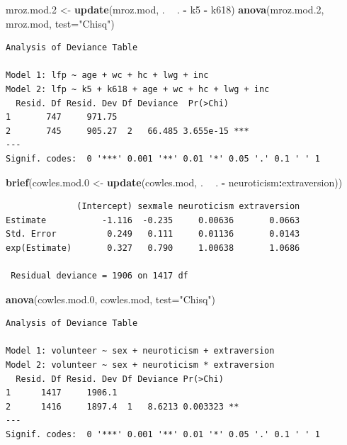 \documentclass[
]{article}
\newenvironment{Shaded}{\begin{snugshade}}{\end{snugshade}}
\newcommand{\DataTypeTok}[1]{\textcolor[rgb]{0.13,0.29,0.53}{#1}}
\newcommand{\FloatTok}[1]{\textcolor[rgb]{0.00,0.00,0.81}{#1}}
\newcommand{\KeywordTok}[1]{\textcolor[rgb]{0.13,0.29,0.53}{\textbf{#1}}}
\newcommand{\NormalTok}[1]{#1}
\newcommand{\OperatorTok}[1]{\textcolor[rgb]{0.81,0.36,0.00}{\textbf{#1}}}
\newcommand{\StringTok}[1]{\textcolor[rgb]{0.31,0.60,0.02}{#1}}
\begin{document}
\begin{Shaded}
\begin{Highlighting}[]
\NormalTok{mroz.mod}\FloatTok{.2}\NormalTok{ <-}\StringTok{ }\KeywordTok{update}\NormalTok{(mroz.mod, . }\OperatorTok{~}\StringTok{ }\NormalTok{. }\OperatorTok{-}\StringTok{ }\NormalTok{k5 }\OperatorTok{-}\StringTok{ }\NormalTok{k618)}
\KeywordTok{anova}\NormalTok{(mroz.mod}\FloatTok{.2}\NormalTok{, mroz.mod, }\DataTypeTok{test=}\StringTok{"Chisq"}\NormalTok{)}
\end{Highlighting}
\end{Shaded}

\begin{verbatim}
Analysis of Deviance Table

Model 1: lfp ~ age + wc + hc + lwg + inc
Model 2: lfp ~ k5 + k618 + age + wc + hc + lwg + inc
  Resid. Df Resid. Dev Df Deviance  Pr(>Chi)    
1       747     971.75                          
2       745     905.27  2   66.485 3.655e-15 ***
---
Signif. codes:  0 '***' 0.001 '**' 0.01 '*' 0.05 '.' 0.1 ' ' 1
\end{verbatim}

\begin{Shaded}
\begin{Highlighting}[]
\KeywordTok{brief}\NormalTok{(cowles.mod}\FloatTok{.0}\NormalTok{ <-}\StringTok{ }\KeywordTok{update}\NormalTok{(cowles.mod, }
\NormalTok{    . }\OperatorTok{~}\StringTok{ }\NormalTok{. }\OperatorTok{-}\StringTok{ }\NormalTok{neuroticism}\OperatorTok{:}\NormalTok{extraversion))}
\end{Highlighting}
\end{Shaded}

\begin{verbatim}
              (Intercept) sexmale neuroticism extraversion
Estimate           -1.116  -0.235     0.00636       0.0663
Std. Error          0.249   0.111     0.01136       0.0143
exp(Estimate)       0.327   0.790     1.00638       1.0686

 Residual deviance = 1906 on 1417 df
\end{verbatim}

\begin{Shaded}
\begin{Highlighting}[]
\KeywordTok{anova}\NormalTok{(cowles.mod}\FloatTok{.0}\NormalTok{, cowles.mod, }\DataTypeTok{test=}\StringTok{"Chisq"}\NormalTok{)}
\end{Highlighting}
\end{Shaded}

\begin{verbatim}
Analysis of Deviance Table

Model 1: volunteer ~ sex + neuroticism + extraversion
Model 2: volunteer ~ sex + neuroticism * extraversion
  Resid. Df Resid. Dev Df Deviance Pr(>Chi)   
1      1417     1906.1                        
2      1416     1897.4  1   8.6213 0.003323 **
---
Signif. codes:  0 '***' 0.001 '**' 0.01 '*' 0.05 '.' 0.1 ' ' 1
\end{verbatim}
\end{document}
